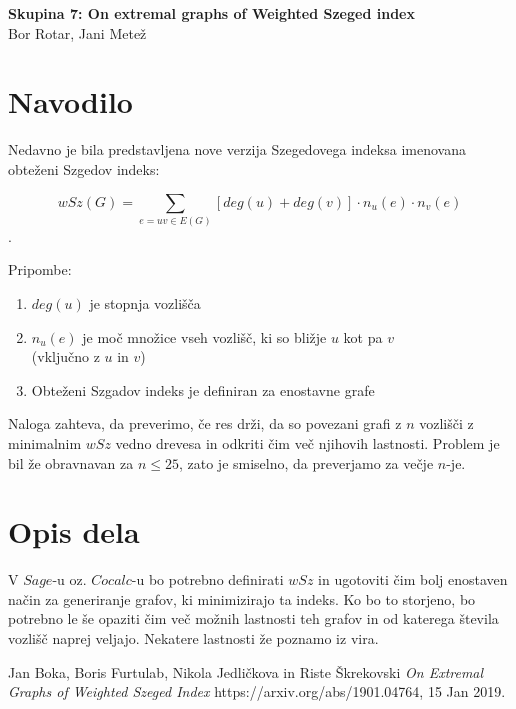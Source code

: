 \documentclass[10pt, a4paper]{article}
\begin{document}
\begin{center}
\Huge \textbf{Skupina 7: On extremal graphs of Weighted Szeged index} \\
\medskip
\Large Bor Rotar, Jani Metež\\
\end{center}

\section{Navodilo}

Nedavno je bila predstavljena nove verzija Szegedovega indeksa imenovana obteženi Szgedov indeks:
\begin{center}
 $$wSz(G) =\sum_{e=uv \in E(G)}[deg(u)+ deg(v) ]\cdot n_{u}(e)\cdot n_{v}(e)$$.
\end{center}
 
\medskip
Pripombe:

\begin{enumerate}
\item $deg(u)$ je stopnja vozlišča
\item $n_{u}(e)$ je moč množice vseh vozlišč, ki so bližje $u$ kot pa $v$ \\ (vključno z $u$ in $v$)
\item Obteženi Szgadov indeks je definiran za enostavne grafe
\end{enumerate}
\medskip

Naloga zahteva, da preverimo, če res drži, da so povezani grafi z $n$ vozlišči z minimalnim $wSz$ vedno drevesa in odkriti čim več njihovih lastnosti. Problem je bil že obravnavan za $n \leq 25$, zato je smiselno, da preverjamo za večje $n$-je.


\section{Opis dela}

V $Sage$-u oz. $Cocalc$-u bo potrebno definirati $wSz$ in ugotoviti čim bolj enostaven način za generiranje grafov, ki minimizirajo ta indeks. Ko bo to storjeno, bo potrebno le še opaziti čim več možnih lastnosti teh grafov in od katerega števila vozlišč naprej veljajo. Nekatere lastnosti že poznamo iz vira.

\begin{thebibliography}{9}
Jan Boka, Boris Furtulab, Nikola Jedličkova in Riste Škrekovski
\textit{On Extremal Graphs of Weighted Szeged Index} 
https://arxiv.org/abs/1901.04764, 15 Jan 2019.
 

\end{thebibliography}
\end{document}
